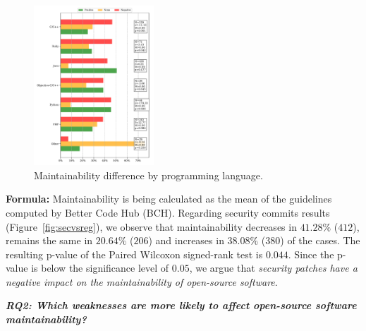 \documentclass[10pt,conference]{IEEEtran}
\begin{document}
\begin{figure}[h]
  \centering
  \includegraphics[width=0.4\textwidth]{figures/main_per_language.pdf}
  \caption{Maintainability difference by programming language.}
  \label{fig:lang_main}  
\end{figure}


\textbf{Formula:} Maintainability is being calculated as the mean of 
the guidelines computed by Better Code Hub (BCH). Regarding security 
commits results (Figure~\ref{fig:secvsreg}), we observe that
maintainability decreases in $41.28\%$ ($412$), remains the same in $20.64\%$ 
($206$) and increases in $38.08\%$ ($380$) of the cases. The resulting
p-value of the Paired Wilcoxon signed-rank test is $0.044$. Since the p-value is 
below the significance level of $0.05$, we argue that \emph{security patches 
have a negative impact on the maintainability of open-source software}.
%

\textit{\textbf{RQ2: Which weaknesses are more likely to
affect open-source software maintainability?}}
\end{document}
